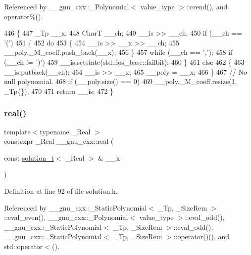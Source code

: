 Referenced by \+\_\+\+\_\+gnu\+\_\+cxx\+::\+\_\+\+Polynomial$<$ value\+\_\+type $>$\+::crend(), and operator\%().


\begin{DoxyCode}
446     \{
447       \_Tp \_\_x;
448       CharT \_\_ch;
449       \_\_is >> \_\_ch;
450       \textcolor{keywordflow}{if} (\_\_ch == \textcolor{charliteral}{'('})
451         \{
452           \textcolor{keywordflow}{do}
453             \{
454               \_\_is >> \_\_x >> \_\_ch;
455               \_\_poly.\_M\_coeff.push\_back(\_\_x);
456             \}
457           \textcolor{keywordflow}{while} (\_\_ch == \textcolor{charliteral}{','});
458           \textcolor{keywordflow}{if} (\_\_ch != \textcolor{charliteral}{')'})
459             \_\_is.setstate(std::ios\_base::failbit);
460         \}
461       \textcolor{keywordflow}{else}
462         \{
463           \_\_is.putback(\_\_ch);
464           \_\_is >> \_\_x;
465           \_\_poly = \_\_x;
466         \}
467       \textcolor{comment}{// No null polynomial.}
468       \textcolor{keywordflow}{if} (\_\_poly.size() == 0)
469         \_\_poly.\_M\_coeff.resize(1, \_Tp\{\});
470 
471       \textcolor{keywordflow}{return} \_\_is;
472     \}
\end{DoxyCode}
\mbox{\label{namespace____gnu__cxx_a2743043701f8e4c87d3f0f06ddb11348}} 
\subsubsection{\texorpdfstring{real()}{real()}}
{\footnotesize\ttfamily template$<$typename \+\_\+\+Real $>$ \\
constexpr \+\_\+\+Real \+\_\+\+\_\+gnu\+\_\+cxx\+::real (\begin{DoxyParamCaption}\item[{const \hyperlink{namespace____gnu__cxx_ae20ea642de50eb361074c62676b0159c}{solution\+\_\+t}$<$ \+\_\+\+Real $>$ \&}]{\+\_\+\+\_\+x }\end{DoxyParamCaption})}



Definition at line 92 of file solution.\+h.



Referenced by \+\_\+\+\_\+gnu\+\_\+cxx\+::\+\_\+\+Static\+Polynomial$<$ \+\_\+\+Tp, \+\_\+\+Size\+Rem $>$\+::eval\+\_\+even(), \+\_\+\+\_\+gnu\+\_\+cxx\+::\+\_\+\+Polynomial$<$ value\+\_\+type $>$\+::eval\+\_\+odd(), \+\_\+\+\_\+gnu\+\_\+cxx\+::\+\_\+\+Static\+Polynomial$<$ \+\_\+\+Tp, \+\_\+\+Size\+Rem $>$\+::eval\+\_\+odd(), \+\_\+\+\_\+gnu\+\_\+cxx\+::\+\_\+\+Static\+Polynomial$<$ \+\_\+\+Tp, \+\_\+\+Size\+Rem $>$\+::operator()(), and std\+::operator$<$().


